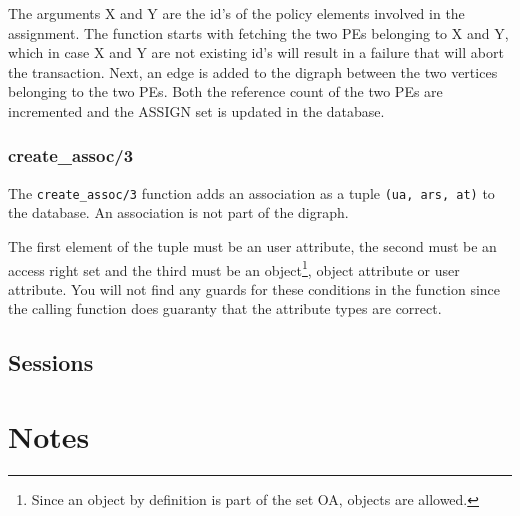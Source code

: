 \documentclass[12pt,a4paper,titlepage]{book}
\begin{document}
		  The arguments X and Y are the id's of the policy elements involved in the assignment. The function starts with fetching the two PEs belonging to X and Y, which in case X and Y are not existing id's will result in a failure that will abort the transaction. Next, an edge is added to the digraph between the two vertices belonging to the two PEs. Both the reference count of the two PEs are incremented and the ASSIGN set is updated in the database.
		  
	\subsection{create\_assoc/3}
	
		The \lstinline|create_assoc/3| function adds an association as a tuple \lstinline|(ua, ars, at)| to the database. An association is not part of the digraph.
		
		The first element of the tuple must be an user attribute, the second must be an access right set and the third must be an object\footnote{Since an object by definition is part of the set OA, objects are allowed.}, object attribute or user attribute. You will not find any guards for these conditions in the function since the calling function does guaranty that the attribute types are correct.
	
	\section{Sessions}
	
	\chapter{Notes}
	
\end{document}
